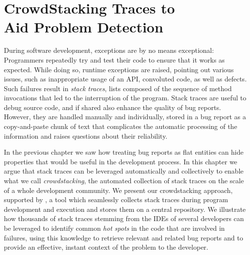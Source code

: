 


\chapter[CrowdStacking Traces to Aid Problem Detection]{CrowdStacking Traces to\\Aid Problem Detection}\label{ch:stacktraces}

During software development, exceptions are by no means exceptional: Programmers repeatedly try and test their code to ensure that it works as expected.
While doing so, runtime exceptions are raised, pointing out various issues, such as inappropriate usage of an API, convoluted code, as well as defects.
Such failures result in \emph{stack traces}, lists composed of the sequence of method invocations that led to the interruption of the program.
Stack traces are useful to debug source code, and if shared also enhance the quality of bug reports.
However, they are handled manually and individually, stored in a bug report as a copy-and-paste chunk of text that complicates the automatic processing of the information and raises questions about their reliability.

In the previous chapter we saw how treating bug reports as flat entities can hide properties that would be useful in the development process.
In this chapter we argue that stack traces can be leveraged automatically and collectively to enable what we call \emph{crowdstacking}, the automated collection of stack traces on the scale of a whole development community.
We present our crowdstacking approach, supported by \slr, a tool which seamlessly collects stack traces during program development and execution and stores them on a central repository.
We illustrate how thousands of stack traces stemming from the IDEs of several developers can be leveraged to identify common \emph{hot spots} in the code that are involved in failures, using this knowledge to retrieve relevant and related bug reports and to provide an effective, instant context of the problem to the developer.

\structure

